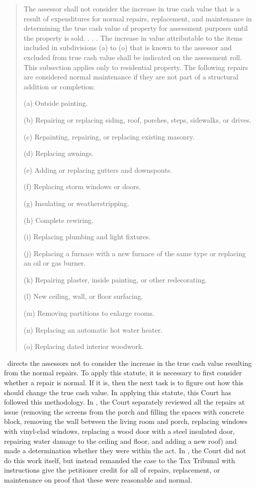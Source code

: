 \documentclass[12pt,\documentclassflag]{michiganCourtOfAppealsBrief}
\def\mathieuGast{\pincite[l]{MCL}{211.27(2)}}
\begin{document}
\begin{quote}
  The assessor shall not consider the increase in true cash value that is a result of expenditures for normal repairs, replacement, and maintenance in determining the true cash value of property for assessment purposes until the property is sold. . . . The increase in value attributable to the items included in subdivisions (a) to (o) that is known to the assessor and excluded from true cash value shall be indicated on the assessment roll. This subsection applies only to residential property. The following repairs are considered normal maintenance if they are not part of a structural addition or completion:

  (a) Outside painting.

  (b) Repairing or replacing siding, roof, porches, steps, sidewalks, or drives.

  (c) Repainting, repairing, or replacing existing masonry.

  (d) Replacing awnings.

  (e) Adding or replacing gutters and downspouts.

  (f) Replacing storm windows or doors.

  (g) Insulating or weatherstripping.

  (h) Complete rewiring.

  (i) Replacing plumbing and light fixtures.

  (j) Replacing a furnace with a new furnace of the same type or replacing an oil or gas burner.

  (k) Repairing plaster, inside painting, or other redecorating.

  (l) New ceiling, wall, or floor surfacing.

  (m) Removing partitions to enlarge rooms.

  (n) Replacing an automatic hot water heater.

  (o) Replacing dated interior woodwork.
\end{quote}

\mathieuGast\ directs the assessors not to consider the increase in the true cash value resulting from the normal repairs. To apply this statute, it is necessary to first consider whether a repair is normal. If it is, then the next task is to figure out how this should change the true cash value. In applying this statute, this Court has followed this methodology. In \cite{Coyne}, the Court separately reviewed all the repairs at issue (removing the screens from the porch and filling the spaces with concrete block, removing the wall between the living room and porch, replacing windows with vinyl-clad windows, replacing a wood door with a steel insulated door, repairing water damage to the ceiling and floor, and adding a new roof) and made a determination whether they were within the act. In \cite{Fisher}, the Court did not do this work itself, but instead remanded the case to the Tax Tribunal with instructions give the petitioner credit for all of repairs, replacement, or maintenance on proof that these were reasonable and normal.
\end{document}

